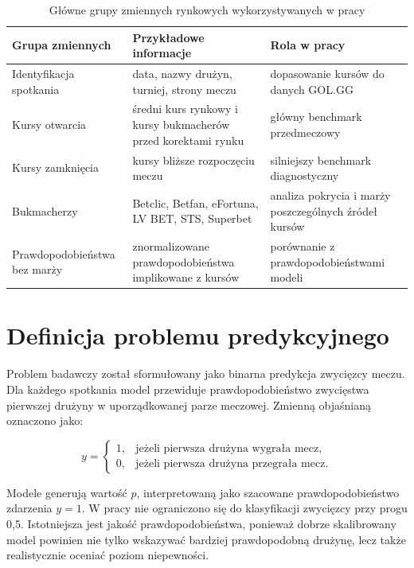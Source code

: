\begin{table}[H]
    \centering
    \caption{Główne grupy zmiennych rynkowych wykorzystywanych w pracy}
    \label{tab:market_variable_groups}
    \small
    \begin{tabular}{p{3.8cm}p{4.8cm}p{4.8cm}}
        \toprule
        Grupa zmiennych & Przykładowe informacje & Rola w pracy \\
        \midrule
        Identyfikacja spotkania & data, nazwy drużyn, turniej, strony meczu & dopasowanie kursów do danych GOL.GG \\
        Kursy otwarcia & średni kurs rynkowy i kursy bukmacherów przed korektami rynku & główny benchmark przedmeczowy \\
        Kursy zamknięcia & kursy bliższe rozpoczęciu meczu & silniejszy benchmark diagnostyczny \\
        Bukmacherzy & Betclic, Betfan, eFortuna, LV BET, STS, Superbet & analiza pokrycia i marży poszczególnych źródeł kursów \\
        Prawdopodobieństwa bez marży & znormalizowane prawdopodobieństwa implikowane z kursów & porównanie z prawdopodobieństwami modeli \\
        \bottomrule
    \end{tabular}
\end{table}

\section{Definicja problemu predykcyjnego}

Problem badawczy został sformułowany jako binarna predykcja zwycięzcy meczu. Dla każdego spotkania
model przewiduje prawdopodobieństwo zwycięstwa pierwszej drużyny w uporządkowanej parze meczowej.
Zmienną objaśnianą oznaczono jako:

\begin{equation}
    y =
    \begin{cases}
        1, & \text{jeżeli pierwsza drużyna wygrała mecz,} \\
        0, & \text{jeżeli pierwsza drużyna przegrała mecz.}
    \end{cases}
\end{equation}

Modele generują wartość \(\hat{p}\), interpretowaną jako szacowane prawdopodobieństwo zdarzenia \(y
= 1\). W pracy nie ograniczono się do klasyfikacji zwycięzcy przy progu 0{,}5. Istotniejsza jest
jakość prawdopodobieństwa, ponieważ dobrze skalibrowany model powinien nie tylko wskazywać bardziej
prawdopodobną drużynę, lecz także realistycznie oceniać poziom niepewności.

